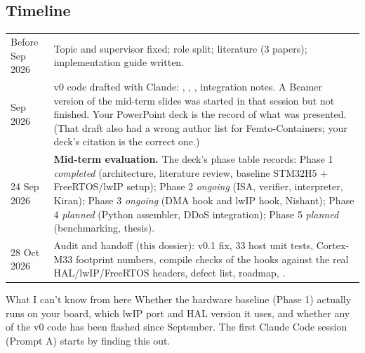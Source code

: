 \documentclass[10pt,a4paper]{article}
\begin{document}
\subsection{Timeline}
\begin{tabularx}{\textwidth}{@{}P{2.7cm}L@{}}
\toprule
Before Sep 2026 & Topic and supervisor fixed; role split; literature (3 papers); implementation guide written. \\
Sep 2026 & v0 code drafted with Claude: , , , integration notes. A Beamer version of the mid-term slides was started in that session but not finished. Your PowerPoint deck is the record of what was presented. (That draft also had a wrong author list for Femto-Containers; your deck's citation is the correct one.) \\
24 Sep 2026 & \textbf{Mid-term evaluation.} The deck's phase table records: Phase 1 \emph{completed} (architecture, literature review, baseline STM32H5 + FreeRTOS/lwIP setup); Phase 2 \emph{ongoing} (ISA, verifier, interpreter, Kiran); Phase 3 \emph{ongoing} (DMA hook and lwIP hook, Nishant); Phase 4 \emph{planned} (Python assembler, DDoS integration); Phase 5 \emph{planned} (benchmarking, thesis). \\
28 Oct 2026 & Audit and handoff (this dossier): v0.1 fix, 33 host unit tests, Cortex-M33 footprint numbers, compile checks of the hooks against the real HAL/lwIP/FreeRTOS headers, defect list, roadmap, . \\
\bottomrule
\end{tabularx}

\begin{warnbox}{What I can't know from here}
Whether the hardware baseline (Phase 1) actually runs on your board, which lwIP port and HAL version it uses, and whether any of the v0 code has been flashed since September. The first Claude Code session (Prompt A) starts by finding this out.
\end{warnbox}

\end{document}
